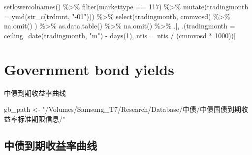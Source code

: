 \documentclass[
]{article}
\newenvironment{Shaded}{\begin{snugshade}}{\end{snugshade}}
\newcommand{\AttributeTok}[1]{\textcolor[rgb]{0.77,0.63,0.00}{#1}}
\newcommand{\DecValTok}[1]{\textcolor[rgb]{0.00,0.00,0.81}{#1}}
\newcommand{\FunctionTok}[1]{\textcolor[rgb]{0.00,0.00,0.00}{#1}}
\newcommand{\NormalTok}[1]{#1}
\newcommand{\OtherTok}[1]{\textcolor[rgb]{0.56,0.35,0.01}{#1}}
\newcommand{\SpecialCharTok}[1]{\textcolor[rgb]{0.00,0.00,0.00}{#1}}
\newcommand{\StringTok}[1]{\textcolor[rgb]{0.31,0.60,0.02}{#1}}
\begin{document}
\begin{Shaded}
\begin{Highlighting}[]
      \FunctionTok{setlowercolnames}\NormalTok{() }\SpecialCharTok{\%\textgreater{}\%} 
      \FunctionTok{filter}\NormalTok{(markettype }\SpecialCharTok{==} \DecValTok{117}\NormalTok{) }\SpecialCharTok{\%\textgreater{}\%} 
      \FunctionTok{mutate}\NormalTok{(}\AttributeTok{tradingmonth =} \FunctionTok{ymd}\NormalTok{(}\FunctionTok{str\_c}\NormalTok{(trdmnt, }\StringTok{"{-}01"}\NormalTok{))) }\SpecialCharTok{\%\textgreater{}\%} 
      \FunctionTok{select}\NormalTok{(tradingmonth, cmmvosd) }\SpecialCharTok{\%\textgreater{}\%} 
      \FunctionTok{na.omit}\NormalTok{()}
\NormalTok{  ) }\SpecialCharTok{\%\textgreater{}\%} 
  \FunctionTok{as.data.table}\NormalTok{() }\SpecialCharTok{\%\textgreater{}\%} 
  \FunctionTok{na.omit}\NormalTok{() }\SpecialCharTok{\%\textgreater{}\%} 
\NormalTok{  .[, .(}\AttributeTok{tradingmonth =} \FunctionTok{ceiling\_date}\NormalTok{(tradingmonth, }\StringTok{"m"}\NormalTok{) }\SpecialCharTok{{-}} \FunctionTok{days}\NormalTok{(}\DecValTok{1}\NormalTok{), }\AttributeTok{ntis =}\NormalTok{ ntis }\SpecialCharTok{/}\NormalTok{ (cmmvosd }\SpecialCharTok{*} \DecValTok{1000}\NormalTok{))] }
\end{Highlighting}
\end{Shaded}

\hypertarget{government-bond-yields}{%
\section{Government bond yields}\label{government-bond-yields}}

中债到期收益率曲线

\begin{Shaded}
\begin{Highlighting}[]
\NormalTok{gb\_path }\OtherTok{\textless{}{-}} \StringTok{"/Volumes/Samsung\_T7/Research/Database/中债/中债国债到期收益率标准期限信息/"}
\end{Highlighting}
\end{Shaded}

\hypertarget{ux4e2dux503aux5230ux671fux6536ux76caux7387ux66f2ux7ebf}{%
\subsection{中债到期收益率曲线}\label{ux4e2dux503aux5230ux671fux6536ux76caux7387ux66f2ux7ebf}}
\end{document}
